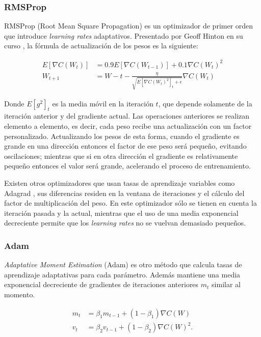 \subsubsection{RMSProp}

RMSProp (Root Mean Square Propagation) es un optimizador de primer orden que introduce \textit{learning rates} adaptativos. Presentado por Geoff Hinton en su curso \cite{rmsprop}, la fórmula de actualización de los pesos es la siguiente:

\begin{align*}
	E[\nabla C(W_t)] &= 0.9 E[\nabla C(W_{t-1})] + 0.1 \nabla C(W_t)^{2}\\
	W_{t+1} &= W-t - \frac{\eta}{\sqrt{E[\nabla C(W_t)^2]_t + \epsilon}}\nabla C(W_t)
\end{align*}

Donde $E[g^2]_t$ es la media móvil en la iteración $t$, que depende solamente de la iteración anterior y del gradiente actual. Las operaciones anteriores se realizan elemento a elemento, es decir, cada peso recibe una actualización con un factor personalizado. Actualizando los pesos de esta forma, cuando el gradiente es grande en una dirección entonces el factor de ese peso será pequeño, evitando oscilaciones; mientras que si en otra dirección el gradiente es relativamente pequeño entonces el valor será grande, acelerando el proceso de entrenamiento.

Existen otros optimizadores que usan tasas de aprendizaje variables como Adagrad \cite{adagrad}, sus diferencias residen en la ventana de iteraciones y el cálculo del factor de multiplicación del peso. En este optimizador sólo se tienen en cuenta la iteración pasada y la actual, mientras que el uso de una media exponencial decreciente permite que los \textit{learning rates} no se vuelvan demasiado pequeños.

\subsubsection{Adam}

\textit{Adaptative Moment Estimation} (Adam) \cite{Adam} es otro método que calcula tasas de aprendizaje adaptativas para cada parámetro. Además mantiene una media exponencial decreciente de gradientes de iteraciones anteriores $m_t$ similar al momento.

\begin{align*}
	m_t&= \beta_1 m_{t-1} + (1-\beta_1)\nabla C(W) \\
	v_t&= \beta_2 v_{t-1} + (1-\beta_2)\nabla C(W)^2.
\end{align*}

